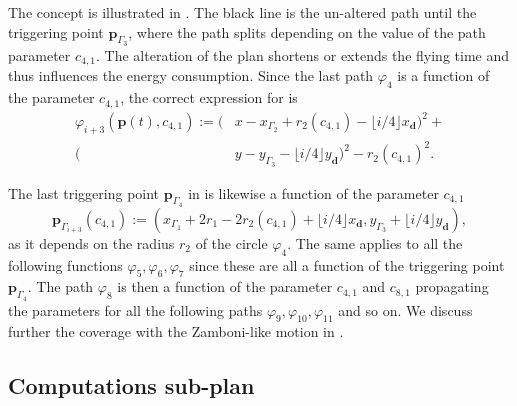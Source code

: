 The concept is illustrated in . The black line is the un-altered path until the triggering point $\mathbf{p}_{\Gamma_3}$, where the path splits depending on the value of the path parameter $c_{4,1}$. The alteration of the plan shortens or extends the flying time and thus influences the energy consumption. Since the last path $\varphi_4$ is a function of the parameter $c_{4,1}$, the correct expression for  is 
\begin{equation}\label{eq:line-gene-param}\begin{split}
  \varphi_{i+3}(\mathbf{p}(t),c_{4,1}):=(&x-x_{\Gamma_2}+r_2(c_{4,1})-\lfloor i/4\rfloor x_\mathbf{d})^2+\\
  (&y-y_{\Gamma_3}-\lfloor i/4\rfloor y_\mathbf{d})^2-r_2(c_{4,1})^2.
\end{split}\end{equation}

The last triggering point $\mathbf{p}_{\Gamma_4}$ in  is likewise a function of the parameter $c_{4,1}$
\begin{equation}
  \mathbf{p}_{\Gamma_{i+3}}(c_{4,1}):=(x_{\Gamma_1}+2r_1-2r_2(c_{4,1})+\lfloor i/4\rfloor x_\mathbf{d},y_{\Gamma_3}+\lfloor i/4\rfloor y_\mathbf{d}),
\end{equation}
as it depends on the radius $r_2$ of the circle $\varphi_4$. The same applies to all the following functions $\varphi_5,\varphi_6,\varphi_7$ since these are all a function of the triggering point $\mathbf{p}_{\Gamma_4}$. The path $\varphi_8$ is then a function of the parameter $c_{4,1}$ and $c_{8,1}$ propagating the parameters for all the following paths $\varphi_9,\varphi_{10},\varphi_{11}$ and so on.
We discuss further the coverage with the Zamboni-like motion in .

\subsection{Computations sub-plan}
\label{sec:computation-wise}

